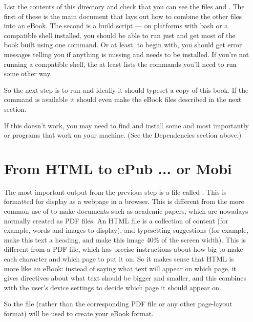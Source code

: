 List the contents of this directory and check that you can see the
files  and . The first of these
is the main \tex document that lays out how to combine the other files
into an eBook.  The second is a build script --- on platforms with
bash or a compatible shell installed, you should be able to run just
 and get most of the book built using one
command. Or at least, to begin with, you should get error messages
telling you if anything is missing and needs to be installed. If you're not
running a compatible shell, the  at least lists
the commands you'll need to run some other way.

So the next step is to run  and ideally it should
typeset a copy of this book. If the  command is
available it should even make the eBook files described in the next
section.

If this doesn't work, you may need to find and install some
 and most importantly  or
 programs that work on your machine. (See the
Dependencies section above.)

\section{From HTML to ePub ... or Mobi}
\label{sec:html2epub}

The most important output from the previous step is a file called
.  This is formatted for display as a webpage
in a browser. This is different from the more common use of \tex to
make documents such as academic papers, which are nowadays normally
created as PDF files. An HTML file is a collection of content (for
example, words and images to display), and typesetting suggestions
(for example, make this text a heading, and make this image 40\% of
the screen width). This is different from a PDF file, which has
precise instructions about how big to make each character and which
page to put it on. So it makes sense that HTML is more like an eBook:
instead of saying what text will appear on which page, it gives
directives about what text should be bigger and smaller, and this
combines with the user's device settings to decide which page it
should appear on.

So the  file (rather than the corresponding
PDF file or any other page-layout format) will be used to
create your eBook format. 

